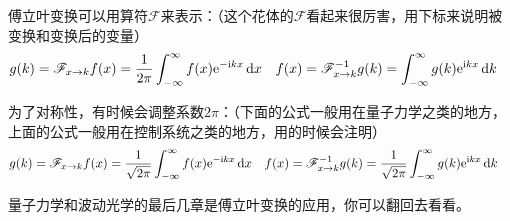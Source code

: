 傅立叶变换可以用算符$\mathscr{F}$来表示：（这个花体的$\mathscr{F}$看起来很厉害，用下标来说明被变换和变换后的变量）
\begin{align*}
g(k)&=\mathscr{F}_{x \rightarrow k} f(x)=\frac{1}{2 \pi} \int_{-\infty}^{\infty} f(x) \mathrm{e}^{-\mathrm{i} k x} \mathop{}\!\mathrm{d} x &
f(x)&=\mathscr{F}^{-1}_{x \rightarrow k} g(k)=\int_{-\infty}^{\infty} g(k) \mathrm{e}^{\mathrm{i} k x} \mathop{}\!\mathrm{d} k
\end{align*}

为了对称性，有时候会调整系数$2 \pi$：（下面的公式一般用在量子力学之类的地方，上面的公式一般用在控制系统之类的地方，用的时候会注明）
\begin{align*}
g(k)&=\mathscr{F}_{x \rightarrow k} f(x)=\frac{1}{\sqrt{2 \pi}} \int_{-\infty}^{\infty} f(x) \mathrm{e}^{-\mathrm{i} k x} \mathop{}\!\mathrm{d} x &
f(x)&=\mathscr{F}^{-1}_{x \rightarrow k} g(k)=\frac{1}{\sqrt{2 \pi}} \int_{-\infty}^{\infty} g(k) \mathrm{e}^{\mathrm{i} k x} \mathop{}\!\mathrm{d} k
\end{align*}

量子力学和波动光学的最后几章是傅立叶变换的应用，你可以翻回去看看。
